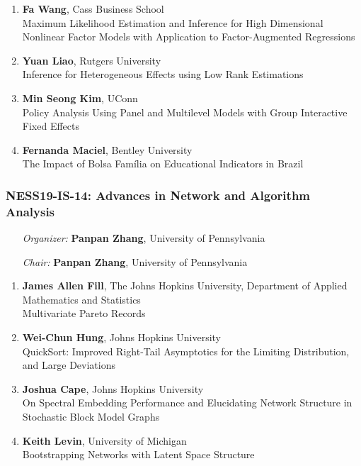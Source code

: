\begin{enumerate}
\item \textbf{Fa Wang}, Cass Business School \\
Maximum Likelihood Estimation and Inference for High Dimensional Nonlinear Factor Models with Application to Factor-Augmented Regressions
\item \textbf{Yuan Liao}, Rutgers University \\
Inference for Heterogeneous Effects using Low Rank Estimations
\item \textbf{Min Seong Kim}, UConn \\
Policy Analysis Using Panel and Multilevel Models with Group Interactive Fixed Effects
\item \textbf{Fernanda Maciel}, Bentley University \\
The Impact of Bolsa Família on Educational Indicators in Brazil
\end{enumerate}

\subsubsection*{NESS19-IS-14: Advances in Network and Algorithm Analysis}

\begin{enumerate}[align=left]
\item [\emph{Organizer:}] \textbf{Panpan Zhang}, University of Pennsylvania \\
\item [\emph{Chair:}] \textbf{Panpan Zhang}, University of Pennsylvania
\end{enumerate}

\begin{enumerate}
\item \textbf{James Allen Fill}, The Johns Hopkins University, Department of Applied Mathematics and Statistics \\
Multivariate Pareto Records
\item \textbf{Wei-Chun Hung}, Johns Hopkins University \\
QuickSort: Improved Right-Tail Asymptotics for the Limiting Distribution, and Large Deviations
\item \textbf{Joshua Cape}, Johns Hopkins University \\
On Spectral Embedding Performance and Elucidating Network Structure in Stochastic Block Model Graphs
\item \textbf{Keith Levin}, University of Michigan \\
Bootstrapping Networks with Latent Space Structure
\end{enumerate}


